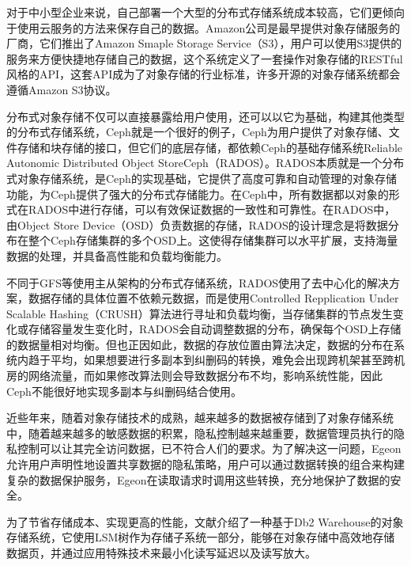 对于中小型企业来说，自己部署一个大型的分布式存储系统成本较高，它们更倾向于使用云服务的方法来保存自己的数据。Amazon公司是最早提供对象存储服务的厂商，它们推出了Amazon Smaple Storage Service\cite{15}（S3），用户可以使用S3提供的服务来方便快捷地存储自己的数据，这个系统定义了一套操作对象存储的RESTful风格的API\cite{16}，这套API成为了对象存储的行业标准，许多开源的对象存储系统都会遵循Amazon S3协议。

分布式对象存储不仅可以直接暴露给用户使用，还可以以它为基础，构建其他类型的分布式存储系统，Ceph\cite{17,18}就是一个很好的例子，Ceph为用户提供了对象存储、文件存储和块存储的接口，但它们的底层存储，都依赖Ceph的基础存储系统Reliable Autonomic Distributed Object StoreCeph\cite{19,20}（RADOS）。RADOS本质就是一个分布式对象存储系统，是Ceph的实现基础，它提供了高度可靠和自动管理的对象存储功能，为Ceph提供了强大的分布式存储能力。在Ceph中，所有数据都以对象的形式在RADOS中进行存储，可以有效保证数据的一致性和可靠性。在RADOS中，由Object Store Device（OSD）负责数据的存储，RADOS的设计理念是将数据分布在整个Ceph存储集群的多个OSD上。这使得存储集群可以水平扩展，支持海量数据的处理，并具备高性能和负载均衡能力。

不同于GFS等使用主从架构的分布式存储系统，RADOS使用了去中心化的解决方案，数据存储的具体位置不依赖元数据，而是使用Controlled Repplication Under Scalable Hashing\cite{21}（CRUSH）算法进行寻址和负载均衡，当存储集群的节点发生变化或存储容量发生变化时，RADOS会自动调整数据的分布，确保每个OSD上存储的数据量相对均衡。但也正因如此，数据的存放位置由算法决定，数据的分布在系统内趋于平均，如果想要进行多副本到纠删码的转换，难免会出现跨机架甚至跨机房的网络流量，而如果修改算法则会导致数据分布不均，影响系统性能，因此Ceph不能很好地实现多副本与纠删码结合使用。

近些年来，随着对象存储技术的成熟，越来越多的数据被存储到了对象存储系统中，随着越来越多的敏感数据的积累，隐私控制越来越重要，数据管理员执行的隐私控制可以让其完全访问数据，已不符合人们的要求。为了解决这一问题，Egeon\cite{22}允许用户声明性地设置共享数据的隐私策略，用户可以通过数据转换的组合来构建复杂的数据保护服务，Egeon在读取请求时调用这些转换，充分地保护了数据的安全。

为了节省存储成本、实现更高的性能，文献\cite{23}介绍了一种基于Db2 Warehouse的对象存储系统，它使用LSM树作为存储子系统一部分，能够在对象存储中高效地存储数据页，并通过应用特殊技术来最小化读写延迟以及读写放大。

